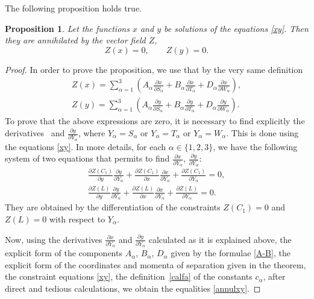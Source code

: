 \documentclass[pdftex]{sigma}
\def\a{\alpha}
\numberwithin{equation}{section}
\newtheorem{Proposition}[Theorem]{Proposition}
\begin{document}
The following proposition holds true.
\begin{Proposition}\label{Zxynul}
Let the functions $x$ and $y$ be solutions of the equations \eqref{xy}. Then they are annihilated by the vector field $Z$,
\begin{equation}\label{annulxy}
Z(x)=0, \qquad Z(y)=0.
\end{equation}
\end{Proposition}
 \begin{proof}
 In order to prove the proposition, we use that by the very same definition
\begin{gather*}
Z(x)= \sum\limits_{\a=1}^3\left( A_{\a}\frac{\partial x}{ \partial S_{\a}}+
B_{\a}\frac{\partial x}{ \partial T_{\a}}+ D_{\a}\frac{\partial x}{ \partial W_{\a}}\right), \\
Z(y)= \sum\limits_{\a=1}^3\left( A_{\a}\frac{\partial y}{ \partial S_{\a}}+
B_{\a}\frac{\partial y}{ \partial T_{\a}}+ D_{\a}\frac{\partial y}{ \partial W_{\a}}\right).
\end{gather*}
To prove that the above expressions are zero, it is necessary to find explicitly the derivatives~\smash{$\frac{\partial x}{\partial Y_{ \a}}$} and $\frac{\partial y}{\partial Y_{ \a}}$, where $Y_{\a}=S_{\a}$ or $Y_{\a}=T_{\a}$ or $Y_{\a}=W_{\a}$.
 This is done using the equations \eqref{xy}. In more details, for each $\a\in \{1,2,3\}$, we have the following system of two equations that permits to find $\frac{\partial x}{\partial Y_{ \a}}$, $\frac{\partial y}{\partial Y_{ \a}}$:
 \begin{gather*}
 \frac{\partial Z(C_1)}{\partial y} \frac{\partial y}{\partial Y_{ \a}}+ \frac{\partial Z(C_1)}{\partial x} \frac{\partial x}{\partial Y_{ \a}}+ \frac{\partial Z(C_1)}{\partial Y_{ \a}}=0,
\\
 \frac{\partial Z(L)}{\partial y} \frac{\partial y}{\partial Y_{ \a}}+ \frac{\partial Z(L)}{\partial x} \frac{\partial x}{\partial Y_{ \a}}+ \frac{\partial Z(L)}{\partial Y_{ \a}}=0.
 \end{gather*}
 They are obtained by the differentiation of the constraints $Z(C_1)=0$ and $Z(L)=0$ with respect to $Y_{ \a}$.%

Now, using the derivatives $\frac{\partial x}{\partial Y_{ \a}}$ and $\frac{\partial y}{\partial Y_{ \a}}$ calculated as it is explained above, the explicit form of the components $A_{\a}$, $B_{\a}$, $D_{\a}$ given by the formulae \eqref{A-B}, the explicit form of the coordinates and momenta of separation given in the theorem, the constraint equations \eqref{xy}, the definition~\eqref{calfa} of the constants $c_{\a}$, after direct and tedious calculations, we obtain the equalities \eqref{annulxy}.
\end{proof}
\end{document}
